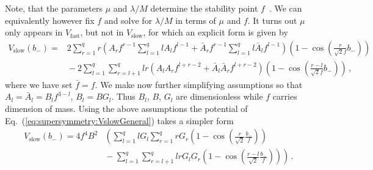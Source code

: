 \documentclass[12pt]{article}
\begin{document}
Note, that the parameters $\mu$ and $\lambda / M$ determine the stability point $f$~\cite{Halverson:2017deq}.
We can equivalently however fix $f$ and solve for $\lambda / M$ in terms of $\mu$ and $f$.
It turns out $\mu$ only appears in $V_\text{fast}$, but not in $V_\text{slow}$, for which an explicit form is given by
\begin{equation} \label{eq:supersymmetry:VslowGeneral}
  \begin{aligned}
    V_\text{slow}\left(b_-\right) =
      &2 \sum_{r = 1}^q r
        \left(A_r f^{r - 1} \sum_{l = 1}^q l A_l f^{l - 1}
          + \bar A_r f^{r - 1} \sum_{l = 1}^q l \bar A_l f^{l - 1}\right)
        \left(1 - \cos\left(\frac{r}{\sqrt 2 f} b_-\right)\right)\\
      &{} - 2 \sum_{l = 1}^q \sum_{r = l + 1}^q
        l r \left(A_l A_r f^{l + r - 2} + \bar A_l \bar A_r f^{l + r - 2}\right)
        \left(1 - \cos\left(\frac{r - l}{\sqrt 2 f} b_-\right)\right)\,,
  \end{aligned}
\end{equation}
where we have set $\bar f = f$.
We make now further simplifying assumptions so that $A_l = \bar A_l = B_l f^{3 - l}$, $B_l = B G_l$.
Thus $B_l$, $B$, $G_l$ are dimensionless while $f$ carries dimension of mass.
Using the above assumptions the potential of Eq.~(\ref{eq:supersymmetry:VslowGeneral}) takes a simpler form
\begin{equation} \label{eq:supersymmetry:Vslow}
  \begin{aligned}
    V_\text{slow}\left(b_-\right) = 4 f^4 B^2 &\left(
      \sum_{l = 1}^q l G_l \sum_{r = 1}^q r G_r
        \left(1 - \cos\left(\frac{r}{\sqrt{2}} \frac{b_-}{f}\right)\right)\right. \\
      &\left.{} - \sum_{l = 1}^q \sum_{r = l + 1}^q l r G_l G_r
        \left(1 - \cos\left(\frac{r - l}{\sqrt{2}} \frac{b_-}{f}\right)\right)
    \right)\,.
  \end{aligned}
\end{equation}
\end{document}
